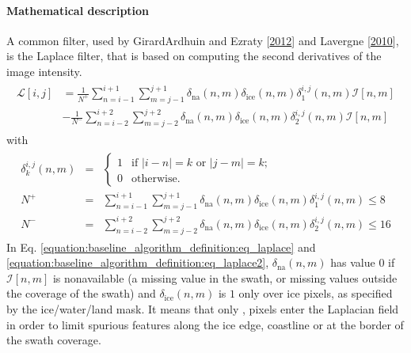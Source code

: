 \documentclass[letterpaper,10pt,english]{jupyterBook}
\begin{document}
\paragraph{Mathematical description}
\label{\detokenize{baseline_algorithm_definition:id3}}
\sphinxAtStartPar
A common filter, used by Girard\sphinxhyphen{}Ardhuin and Ezraty {[}\hyperlink{cite.references:id7}{2012}{]} and Lavergne  {[}\hyperlink{cite.references:id19}{2010}{]}, is the Laplace filter, that is based on computing the second derivatives of the image intensity.
\begin{equation}\label{equation:baseline_algorithm_definition:eq_laplace}
\begin{split}
\begin{split}
\mathcal{L}[i,j] &= \frac{1}{N^{+}} \sum_{n=i-1}^{i+1} \sum_{m=j-1}^{j+1}
                       \delta_{\textrm{na}}(n,m) \delta_{\textrm{ice}}(n,m) \delta_1^{i,j}(n,m) \mathcal{I}[n,m] \\
                 &- \frac{1}{N^{-}} \sum_{n=i-2}^{i+2} \sum_{m=j-2}^{j+2}
               \delta_{\textrm{na}}(n,m) \delta_{\textrm{ice}}(n,m) \delta_2^{i,j}(n,m) \mathcal{I}[n,m] 
\end{split}
\end{split}
\end{equation}
\sphinxAtStartPar
with
\begin{equation}\label{equation:baseline_algorithm_definition:eq_laplace2}
\begin{split}
\begin{aligned}
\delta_k^{i,j}(n,m) & = & \left\{ \begin{array}{ll} 1 & \mbox{if $|i-n| = k$ or $|j-m| = k$};\\ \nonumber
             0 & \mbox{otherwise}.\end{array} \right.   \\ \nonumber
N^{+} &=& \sum_{n=i-1}^{i+1} \sum_{m=j-1}^{j+1} \delta_{\textrm{na}}(n,m) \delta_{\textrm{ice}}(n,m) \delta_1^{i,j}(n,m)  \leq  8 \\ \nonumber
N^{-} &=& \sum_{n=i-2}^{i+2} \sum_{m=j-2}^{j+2} \delta_{\textrm{na}}(n,m) \delta_{\textrm{ice}}(n,m) \delta_2^{i,j}(n,m)  \leq  16 \nonumber
\end{aligned}
\end{split}
\end{equation}
\sphinxAtStartPar
In Eq. \eqref{equation:baseline_algorithm_definition:eq_laplace} and \eqref{equation:baseline_algorithm_definition:eq_laplace2}, \(\delta_{\textrm{na}}(n,m)\) has value \(0\) if \(\mathcal{I}[n,m]\) is
non\sphinxhyphen{}available (a missing value in the swath, or missing values outside the coverage of the swath) and
\(\delta_{\textrm{ice}}(n,m)\) is \(1\) only over ice pixels, as
specified by the ice/water/land mask. It means that only , 
pixels enter the Laplacian field in order to limit spurious features
along the ice edge, coastline or at the border of the swath coverage.
\end{document}
